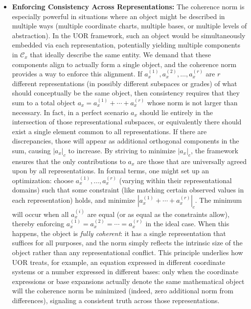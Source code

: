 \documentclass[12pt]{article}
\begin{document}
\begin{itemize}
    \item \textbf{Enforcing Consistency Across Representations:} The coherence norm is especially powerful in situations where an object might be described in multiple ways (multiple coordinate charts, multiple bases, or multiple levels of abstraction). In the UOR framework, such an object would be simultaneously embedded via each representation, potentially yielding multiple components in $\mathcal{C}_x$ that ideally describe the same entity. We demand that these components align to actually form a single object, and the coherence norm provides a way to enforce this alignment. If $a_x^{(1)}, a_x^{(2)}, \dots, a_x^{(r)}$ are $r$ different representations (in possibly different subspaces or grades) of what should conceptually be the same object, then consistency requires that they sum to a total object $a_x = a_x^{(1)} + \cdots + a_x^{(r)}$ whose norm is not larger than necessary. In fact, in a perfect scenario $a_x$ should lie entirely in the intersection of those representational subspaces, or equivalently there should exist a single element common to all representations. If there are discrepancies, those will appear as additional orthogonal components in the sum, causing $|a_x|_c$ to increase. By striving to minimize $|a_x|_c$, the framework ensures that the only contributions to $a_x$ are those that are universally agreed upon by all representations. In formal terms, one might set up an optimization: choose $a_x^{(1)},\ldots,a_x^{(r)}$ (varying within their representational domains) such that some constraint (like matching certain observed values in each representation) holds, and minimize $|a_x^{(1)}+\cdots+a_x^{(r)}|_c$. The minimum will occur when all $a_x^{(i)}$ are equal (or as equal as the constraints allow), thereby enforcing $a_x^{(1)} = a_x^{(2)} = \cdots = a_x^{(r)}$ in the ideal case. When this happens, the object is \emph{fully coherent}: it has a single representation that suffices for all purposes, and the norm simply reflects the intrinsic size of the object rather than any representational conflict. This principle underlies how UOR treats, for example, an equation expressed in different coordinate systems or a number expressed in different bases: only when the coordinate expressions or base expansions actually denote the same mathematical object will the coherence norm be minimized (indeed, zero additional norm from differences), signaling a consistent truth across those representations.
\end{itemize}
\end{document}
